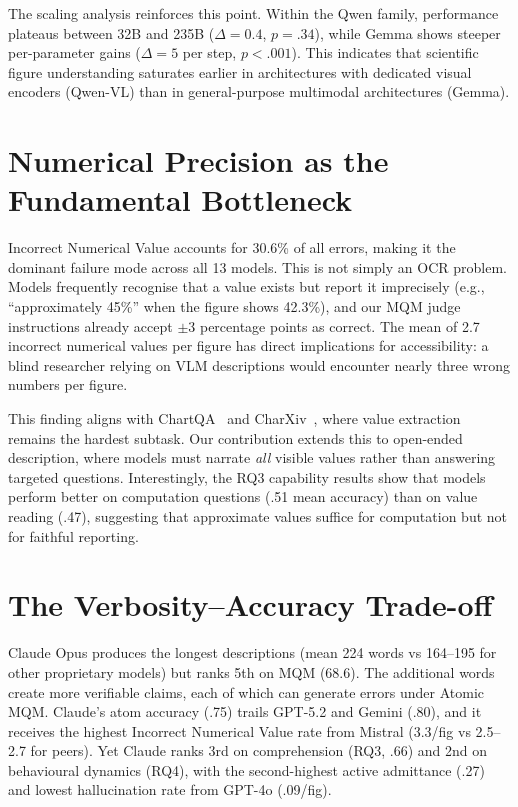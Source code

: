 The scaling analysis reinforces this point.
Within the Qwen family, performance plateaus between 32B and 235B ($\Delta{=}0.4$, $p{=}.34$), while Gemma shows steeper per-parameter gains ($\Delta{=}5$ per step, $p{<}.001$).
This indicates that scientific figure understanding saturates earlier in architectures with dedicated visual encoders (Qwen-VL) than in general-purpose multimodal architectures (Gemma).

\section{Numerical Precision as the Fundamental Bottleneck}\label{sec:disc-numerical}

Incorrect Numerical Value accounts for 30.6\% of all errors, making it the dominant failure mode across all 13 models.
This is not simply an OCR problem.
Models frequently recognise that a value exists but report it imprecisely (e.g., ``approximately 45\%'' when the figure shows 42.3\%), and our MQM judge instructions already accept $\pm$3 percentage points as correct.
The mean of 2.7 incorrect numerical values per figure has direct implications for accessibility: a blind researcher relying on VLM descriptions would encounter nearly three wrong numbers per figure.

This finding aligns with ChartQA~\citep{masry2022chartqa} and CharXiv~\citep{wang2024charxiv}, where value extraction remains the hardest subtask.
Our contribution extends this to open-ended description, where models must narrate \emph{all} visible values rather than answering targeted questions.
Interestingly, the RQ3 capability results show that models perform better on computation questions (.51 mean accuracy) than on value reading (.47), suggesting that approximate values suffice for computation but not for faithful reporting.

\section{The Verbosity--Accuracy Trade-off}\label{sec:disc-verbosity}

Claude Opus produces the longest descriptions (mean 224 words vs 164--195 for other proprietary models) but ranks 5th on MQM (68.6).
The additional words create more verifiable claims, each of which can generate errors under Atomic MQM.
Claude's atom accuracy (.75) trails GPT-5.2 and Gemini (.80), and it receives the highest Incorrect Numerical Value rate from Mistral (3.3/fig vs 2.5--2.7 for peers).
Yet Claude ranks 3rd on comprehension (RQ3, .66) and 2nd on behavioural dynamics (RQ4), with the second-highest active admittance (.27) and lowest hallucination rate from GPT-4o (.09/fig).

